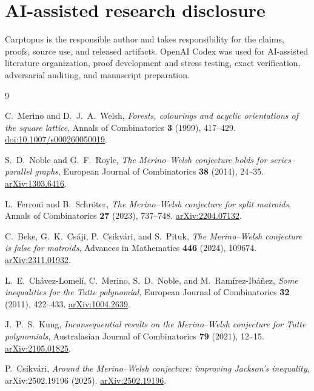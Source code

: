 \documentclass[11pt]{article}
\begin{document}
\section*{AI-assisted research disclosure}


Carptopus is the responsible author and takes responsibility for the claims,
proofs, source use, and released artifacts. OpenAI Codex was used for
AI-assisted literature organization, proof development and stress testing,
exact verification, adversarial auditing, and manuscript preparation.

\begin{thebibliography}{9}
\footnotesize
\raggedright

C.~Merino and D.~J.~A.~Welsh,
\emph{Forests, colourings and acyclic orientations of the square lattice},
Annals of Combinatorics \textbf{3} (1999), 417--429.
\href{https://doi.org/10.1007/s000260050019}{doi:10.1007/s000260050019}.

S.~D.~Noble and G.~F.~Royle,
\emph{The Merino--Welsh conjecture holds for series--parallel graphs},
European Journal of Combinatorics \textbf{38} (2014), 24--35.
\href{https://arxiv.org/abs/1303.6416}{arXiv:1303.6416}.

L.~Ferroni and B.~Schr\"oter,
\emph{The Merino--Welsh conjecture for split matroids},
Annals of Combinatorics \textbf{27} (2023), 737--748.
\href{https://arxiv.org/abs/2204.07132}{arXiv:2204.07132}.

C.~Beke, G.~K.~Cs\'aji, P.~Csikv\'ari, and S.~Pituk,
\emph{The Merino--Welsh conjecture is false for matroids},
Advances in Mathematics \textbf{446} (2024), 109674.
\href{https://arxiv.org/abs/2311.01932}{arXiv:2311.01932}.

L.~E.~Ch\'avez-Lomel\'i, C.~Merino, S.~D.~Noble, and M.~Ram\'irez-Ib\'a\~nez,
\emph{Some inequalities for the Tutte polynomial},
European Journal of Combinatorics \textbf{32} (2011), 422--433.
\href{https://arxiv.org/abs/1004.2639}{arXiv:1004.2639}.

J.~P.~S.~Kung,
\emph{Inconsequential results on the Merino--Welsh conjecture for Tutte polynomials},
Australasian Journal of Combinatorics \textbf{79} (2021), 12--15.
\href{https://arxiv.org/abs/2105.01825}{arXiv:2105.01825}.

P.~Csikv\'ari,
\emph{Around the Merino--Welsh conjecture: improving Jackson's inequality},
arXiv:2502.19196 (2025).
\href{https://arxiv.org/abs/2502.19196}{arXiv:2502.19196}.

\end{thebibliography}
\end{document}
